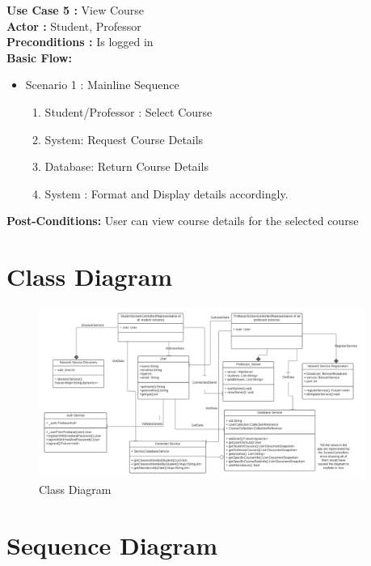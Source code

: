 \documentclass{article}
\begin{document}
\textbf{Use Case 5 : }View Course\\
\textbf{Actor : }Student, Professor\\
\textbf{Preconditions : }Is logged in\\
\textbf{Basic Flow: } 
\begin{itemize}
    \item Scenario 1 : Mainline Sequence
        \begin{enumerate}
            \item Student/Professor : Select Course
            \item System: Request Course Details
            \item  Database:  Return Course Details
\item System : Format and Display details accordingly.        
\end{enumerate}
\end{itemize}
\textbf{Post-Conditions: }User can view course details for the selected course\\



\section{Class Diagram}
\begin{figure}[H]
    \centering
    \includegraphics[width=0.95\textwidth]{ClassDiagram.jpeg}
    \caption{Class Diagram}
    \label{fig:ClassDiagram}
\end{figure}

\section{Sequence Diagram} 
\end{document}
